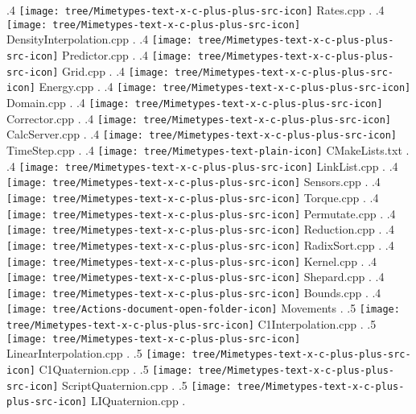 {.4 { \texttt{[image: tree/Mimetypes-text-x-c-plus-plus-src-icon]} Rates.cpp }.
.4 { \texttt{[image: tree/Mimetypes-text-x-c-plus-plus-src-icon]} DensityInterpolation.cpp }.
.4 { \texttt{[image: tree/Mimetypes-text-x-c-plus-plus-src-icon]} Predictor.cpp }.
.4 { \texttt{[image: tree/Mimetypes-text-x-c-plus-plus-src-icon]} Grid.cpp }.
.4 { \texttt{[image: tree/Mimetypes-text-x-c-plus-plus-src-icon]} Energy.cpp }.
.4 { \texttt{[image: tree/Mimetypes-text-x-c-plus-plus-src-icon]} Domain.cpp }.
.4 { \texttt{[image: tree/Mimetypes-text-x-c-plus-plus-src-icon]} Corrector.cpp }.
.4 { \texttt{[image: tree/Mimetypes-text-x-c-plus-plus-src-icon]} CalcServer.cpp }.
.4 { \texttt{[image: tree/Mimetypes-text-x-c-plus-plus-src-icon]} TimeStep.cpp }.
.4 { \texttt{[image: tree/Mimetypes-text-plain-icon]} CMakeLists.txt }.
.4 { \texttt{[image: tree/Mimetypes-text-x-c-plus-plus-src-icon]} LinkList.cpp }.
.4 { \texttt{[image: tree/Mimetypes-text-x-c-plus-plus-src-icon]} Sensors.cpp }.
.4 { \texttt{[image: tree/Mimetypes-text-x-c-plus-plus-src-icon]} Torque.cpp }.
.4 { \texttt{[image: tree/Mimetypes-text-x-c-plus-plus-src-icon]} Permutate.cpp }.
.4 { \texttt{[image: tree/Mimetypes-text-x-c-plus-plus-src-icon]} Reduction.cpp }.
.4 { \texttt{[image: tree/Mimetypes-text-x-c-plus-plus-src-icon]} RadixSort.cpp }.
.4 { \texttt{[image: tree/Mimetypes-text-x-c-plus-plus-src-icon]} Kernel.cpp }.
.4 { \texttt{[image: tree/Mimetypes-text-x-c-plus-plus-src-icon]} Shepard.cpp }.
.4 { \texttt{[image: tree/Mimetypes-text-x-c-plus-plus-src-icon]} Bounds.cpp }.
.4 { \texttt{[image: tree/Actions-document-open-folder-icon]} Movements }.
.5 { \texttt{[image: tree/Mimetypes-text-x-c-plus-plus-src-icon]} C1Interpolation.cpp }.
.5 { \texttt{[image: tree/Mimetypes-text-x-c-plus-plus-src-icon]} LinearInterpolation.cpp }.
.5 { \texttt{[image: tree/Mimetypes-text-x-c-plus-plus-src-icon]} C1Quaternion.cpp }.
.5 { \texttt{[image: tree/Mimetypes-text-x-c-plus-plus-src-icon]} ScriptQuaternion.cpp }.
.5 { \texttt{[image: tree/Mimetypes-text-x-c-plus-plus-src-icon]} LIQuaternion.cpp }.
}
